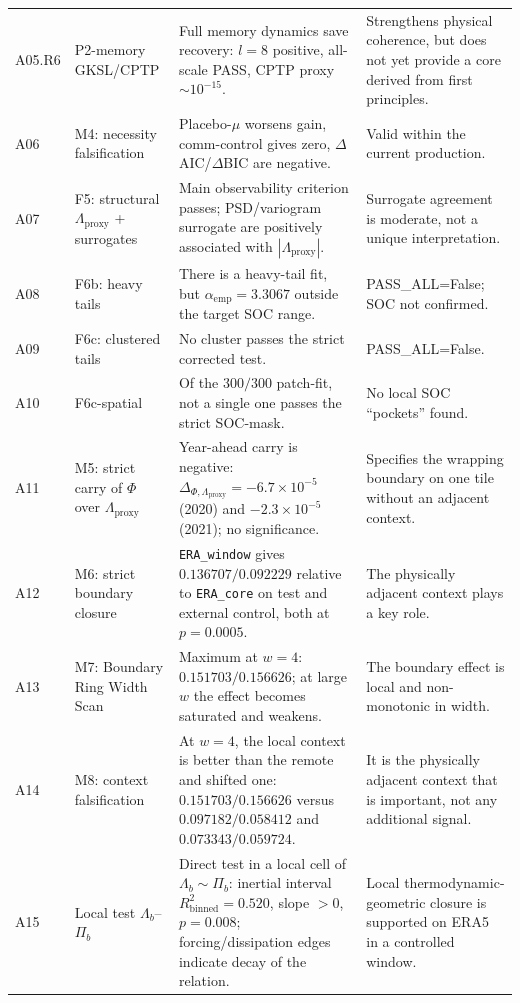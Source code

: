 \documentclass[11pt,a4paper]{article}
\theoremstyle{definition}
\theoremstyle{plain}
\theoremstyle{remark}
\begin{document}
{\begin{longtable}{@{}p{1.3cm}p{3.3cm}p{5.0cm}p{3.6cm}@{}}
A05.R6 & P2-memory GKSL/CPTP & Full memory dynamics save recovery: $l=8$ positive, all-scale PASS, CPTP proxy $\sim 10^{-15}$. & Strengthens physical coherence, but does not yet provide a core derived from first principles. \\
A06 & M4: necessity falsification & Placebo-\(\mu\) worsens gain, comm-control gives zero, $\Delta$AIC/\(\Delta\)BIC are negative. & Valid within the current production. \\
A07 & F5: structural $\Lambda_{\mathrm{proxy}}$ + surrogates & Main observability criterion passes; PSD/variogram surrogate are positively associated with \(|\Lambda_{\mathrm{proxy}}|\). & Surrogate agreement is moderate, not a unique interpretation. \\
A08 & F6b: heavy tails & There is a heavy-tail fit, but \(\alpha_{\mathrm{emp}}=3.3067\) outside the target SOC range. &PASS\_ALL=False; SOC not confirmed. \\
A09 & F6c: clustered tails & No cluster passes the strict corrected test. &PASS\_ALL=False. \\
A10 & F6c-spatial & Of the $300/300$ patch-fit, not a single one passes the strict SOC-mask. & No local SOC ``pockets'' found. \\
A11 & M5: strict carry of $\Phi$ over $\Lambda_{\mathrm{proxy}}$ & Year-ahead carry is negative: $\Delta_{\Phi,\Lambda_{\mathrm{proxy}}}=-6.7\times10^{-5}$ (2020) and $-2.3\times10^{-5}$ (2021); no significance. & Specifies the wrapping boundary on one tile without an adjacent context. \\
A12 & M6: strict boundary closure & \texttt{ERA\_window} gives $0.136707/0.092229$ relative to \texttt{ERA\_core} on test and external control, both at $p=0.0005$. & The physically adjacent context plays a key role. \\
A13 & M7: Boundary Ring Width Scan & Maximum at $w=4$: $0.151703/0.156626$; at large $w$ the effect becomes saturated and weakens. & The boundary effect is local and non-monotonic in width. \\
A14 & M8: context falsification & At $w=4$, the local context is better than the remote and shifted one: $0.151703/0.156626$ versus $0.097182/0.058412$ and $0.073343/0.059724$. & It is the physically adjacent context that is important, not any additional signal. \\
A15 & Local test $\Lambda_b$--$\Pi_b$ & Direct test in a local cell of \(\Lambda_b\sim\Pi_b\): inertial interval $R^2_{\mathrm{binned}}=0.520$, slope $>0$, $p=0.008$; forcing/dissipation edges indicate decay of the relation. & Local thermodynamic-geometric closure is supported on ERA5 in a controlled window. \\
\bottomrule
\end{longtable}
}
\end{document}

